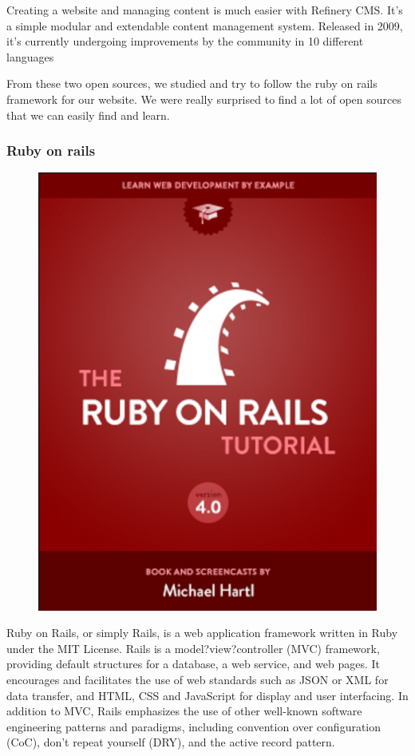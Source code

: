 \documentclass[conference]{IEEEtran}
\begin{document}
Creating a website and managing content is much easier with Refinery CMS. It's a simple modular and extendable content management system. Released in 2009, it's currently undergoing improvements by the community in 10 different languages

From these two open sources, we studied and try to follow the ruby on rails framework for our website. We were really surprised to find a lot of open sources that we can easily find and learn.


\subsubsection{Ruby on rails}
\begin{figure}[H]
\begin{center}
    \includegraphics[scale=0.5]{ruby}
    \label{fig:label}
\end{center}
\end{figure}
Ruby on Rails, or simply Rails, is a web application framework written in Ruby under the MIT License. Rails is a model?view?controller (MVC) framework, providing default structures for a database, a web service, and web pages. It encourages and facilitates the use of web standards such as JSON or XML for data transfer, and HTML, CSS and JavaScript for display and user interfacing. In addition to MVC, Rails emphasizes the use of other well-known software engineering patterns and paradigms, including convention over configuration (CoC), don't repeat yourself (DRY), and the active record pattern.
\end{document}
